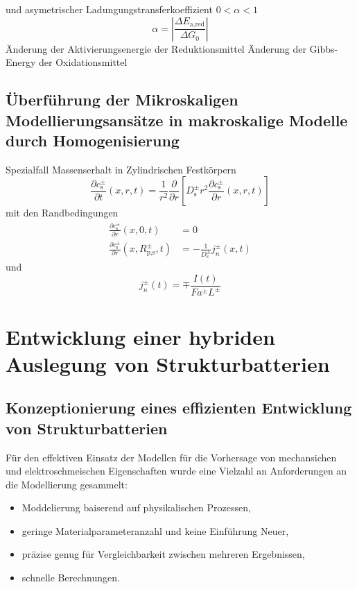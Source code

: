 und asymetrischer Ladungungstransferkoeffizient $0<\alpha<1$
\begin{equation}
        \alpha = \left|\frac{\Delta E_{\text{a,red}}}{\Delta G_0}\right|
\end{equation}
Änderung der Aktivierungsenergie der Reduktionsmittel
Änderung der Gibbs-Energy der Oxidationsmittel



\section{Überführung der Mikroskaligen Modellierungsansätze in makroskalige Modelle durch Homogenisierung}

Spezialfall Massenserhalt in Zylindrischen Festkörpern
\begin{equation}
    \frac{\partial c_{\text{s}}^{\pm}}{\partial t}(x,r,t) = \frac{1}{r^2} \frac{\partial}{ \partial r} \left[ D_{\text{s}}^\pm r^2 \frac{\partial c_{\text{s}}^\pm}{\partial r}(x,r,t)\right]
\end{equation}
mit den Randbedingungen
\begin{align}
    \frac{\partial c_{\text{s}}^{\pm}}{\partial r}(x,0,t) &= 0 \\
    \frac{\partial c_{\text{s}}^{\pm}}{\partial r}(x,R_{\text{p,s}}^{\pm},t) &= -\frac{1}{ D_{\text{s}}^\pm} j_{n}^{\pm}(x,t)
\end{align}
und
\begin{equation}
j_{n}^{\pm}(t) = \mp \frac{I(t)}{F a^{\pm} L^{\pm}}
\end{equation}


\chapter{Entwicklung einer hybriden Auslegung von Strukturbatterien}

\section{Konzeptionierung eines effizienten Entwicklung von Strukturbatterien}
Für den effektiven Einsatz der Modellen für die Vorhersage von mechansichen und elektroschmeischen Eigenschaften wurde eine Vielzahl an Anforderungen an die Modellierung gesammelt:
\begin{itemize}
    \item Moddelierung baiserend auf physikalischen Prozessen, %
    \item geringe Materialparameteranzahl und keine Einführung Neuer, %
    \item präzise genug für Vergleichbarkeit zwischen mehreren Ergebnissen, %
    \item schnelle Berechnungen. %
\end{itemize} 

